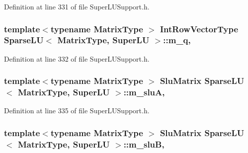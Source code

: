 Definition at line 331 of file Super\-L\-U\-Support.\-h.

\hypertarget{class_sparse_l_u_3_01_matrix_type_00_01_super_l_u_01_4_aaa8b743a946f2e1ad0c2828fe7149576}{
\subsubsection[{m\-\_\-q}]{\setlength{\rightskip}{0pt plus 5cm}template$<$typename Matrix\-Type $>$ {\bf Int\-Row\-Vector\-Type} {\bf Sparse\-L\-U}$<$ Matrix\-Type, {\bf Super\-L\-U} $>$\-::m\-\_\-q\hspace{0.3cm}{\ttfamily [mutable]}, {\ttfamily [protected]}}}\label{class_sparse_l_u_3_01_matrix_type_00_01_super_l_u_01_4_aaa8b743a946f2e1ad0c2828fe7149576}


Definition at line 332 of file Super\-L\-U\-Support.\-h.

\hypertarget{class_sparse_l_u_3_01_matrix_type_00_01_super_l_u_01_4_aa35e7477b877824fa14eb1f759f8eb3b}{
\subsubsection[{m\-\_\-slu\-A}]{\setlength{\rightskip}{0pt plus 5cm}template$<$typename Matrix\-Type $>$ {\bf Slu\-Matrix} {\bf Sparse\-L\-U}$<$ Matrix\-Type, {\bf Super\-L\-U} $>$\-::m\-\_\-slu\-A\hspace{0.3cm}{\ttfamily [mutable]}, {\ttfamily [protected]}}}\label{class_sparse_l_u_3_01_matrix_type_00_01_super_l_u_01_4_aa35e7477b877824fa14eb1f759f8eb3b}


Definition at line 335 of file Super\-L\-U\-Support.\-h.

\hypertarget{class_sparse_l_u_3_01_matrix_type_00_01_super_l_u_01_4_a07f5889a610dee96568fc82738b54d8c}{
\subsubsection[{m\-\_\-slu\-B}]{\setlength{\rightskip}{0pt plus 5cm}template$<$typename Matrix\-Type $>$ {\bf Slu\-Matrix} {\bf Sparse\-L\-U}$<$ Matrix\-Type, {\bf Super\-L\-U} $>$\-::m\-\_\-slu\-B\hspace{0.3cm}{\ttfamily [mutable]}, {\ttfamily [protected]}}}\label{class_sparse_l_u_3_01_matrix_type_00_01_super_l_u_01_4_a07f5889a610dee96568fc82738b54d8c}


